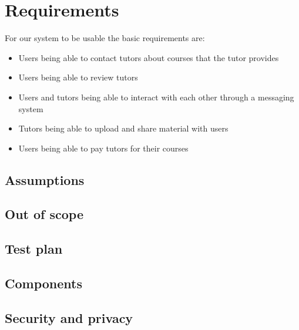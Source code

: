\section{Requirements}
For our system to be usable the basic requirements are:

\begin{itemize}
    \item Users being able to contact tutors about courses that the tutor provides
    \item Users being able to review tutors
    \item Users and tutors being able to interact with each other through a messaging system
    \item Tutors being able to upload and share material with users
    \item Users being able to pay tutors for their courses
\end{itemize}

\subsection{Assumptions}

\subsection{Out of scope}

\subsection{Test plan}

\subsection{Components}

\subsection{Security and privacy}

